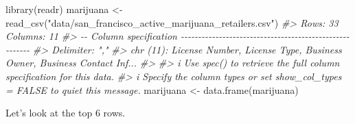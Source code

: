 \documentclass[
]{krantz}
\makeatletter
\newenvironment{Shaded}{\begin{snugshade}}{\end{snugshade}}
\newcommand{\CommentTok}[1]{\textcolor[rgb]{0.37,0.37,0.37}{\textit{#1}}}
\newcommand{\FunctionTok}[1]{\textcolor[rgb]{0,0,0}{#1}}
\newcommand{\NormalTok}[1]{#1}
\newcommand{\OtherTok}[1]{\textcolor[rgb]{0.37,0.37,0.37}{#1}}
\newcommand{\StringTok}[1]{\textcolor[rgb]{0.5,0.5,0.5}{#1}}
\newenvironment{kframe}{%
\medskip{}
\setlength{\fboxsep}{.8em}
 \def\at@end@of@kframe{}%
 \ifinner\ifhmode%
  \def\at@end@of@kframe{\end{minipage}}%
  \begin{minipage}{\columnwidth}%
 \fi\fi%
 \def\FrameCommand##1{\hskip\@totalleftmargin \hskip-\fboxsep
 \colorbox{shadecolor}{##1}\hskip-\fboxsep
     \hskip-\linewidth \hskip-\@totalleftmargin \hskip\columnwidth}%
 \MakeFramed {\advance\hsize-\width
   \@totalleftmargin\z@ \linewidth\hsize
   \@setminipage}}%
 {\par\unskip\endMakeFramed%
 \at@end@of@kframe}
\renewenvironment{Shaded}{\begin{kframe}}{\end{kframe}}
\makeatother
\begin{document}
\begin{Shaded}
\begin{Highlighting}[]
\FunctionTok{library}\NormalTok{(readr)}
\NormalTok{marijuana }\OtherTok{\textless{}{-}} \FunctionTok{read\_csv}\NormalTok{(}\StringTok{"data/san\_francisco\_active\_marijuana\_retailers.csv"}\NormalTok{)}
\CommentTok{\#\textgreater{} Rows: 33 Columns: 11}
\CommentTok{\#\textgreater{} {-}{-} Column specification {-}{-}{-}{-}{-}{-}{-}{-}{-}{-}{-}{-}{-}{-}{-}{-}{-}{-}{-}{-}{-}{-}{-}{-}{-}{-}{-}{-}{-}{-}{-}{-}{-}{-}{-}{-}{-}{-}{-}{-}{-}{-}{-}{-}{-}{-}{-}{-}{-}{-}{-}{-}{-}{-}{-}{-}}
\CommentTok{\#\textgreater{} Delimiter: ","}
\CommentTok{\#\textgreater{} chr (11): License Number, License Type, Business Owner, Business Contact Inf...}
\CommentTok{\#\textgreater{} }
\CommentTok{\#\textgreater{} i Use \textasciigrave{}spec()\textasciigrave{} to retrieve the full column specification for this data.}
\CommentTok{\#\textgreater{} i Specify the column types or set \textasciigrave{}show\_col\_types = FALSE\textasciigrave{} to quiet this message.}
\NormalTok{marijuana }\OtherTok{\textless{}{-}} \FunctionTok{data.frame}\NormalTok{(marijuana)}
\end{Highlighting}
\end{Shaded}

Let's look at the top 6 rows.
\end{document}
